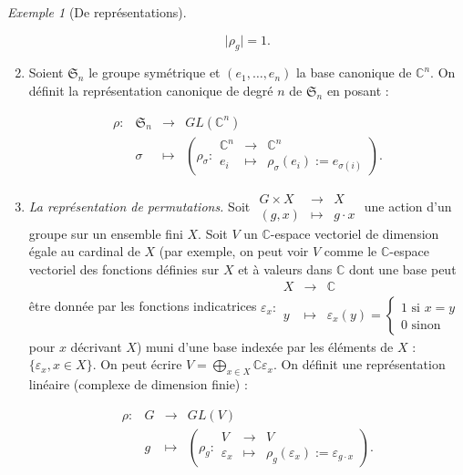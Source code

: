 \documentclass[french]{book}
\theoremstyle{definition}
\theoremstyle{remark}
\newtheorem*{protoexemple}{Exemple}
\newenvironment{exemple}
    {\colorlet{shadecolor}{gray!10}\begin{shaded}\begin{protoexemple}}
    {\end{protoexemple}\end{shaded}}
\begin{document}
\begin{exemple}[De représentations]
\begin{enumerate}
      \[
      \lvert \rho_g \rvert = 1.
      \]

      \item Soient $\mathfrak{S}_n$ le groupe symétrique et $(e_1, \dots, e_n)$ la base canonique de $\mathbb{C} ^{n}$. On définit la représentation canonique de degré $n$ de $\mathfrak{S}_n$ en posant :

      \[\begin{matrix}
      \rho : & \mathfrak{S}_n & \longrightarrow & GL(\mathbb{C} ^{n}) \\
      \ & \sigma & \longmapsto & \left( \rho _{\sigma} : \begin{matrix}
      \mathbb{C} ^{n} & \longrightarrow & \mathbb{C}^{n} \\
      e_i & \longmapsto & \rho _{\sigma}(e_i) := e _{\sigma(i)}
      \end{matrix}\right).
      \end{matrix}\]





      \item \emph{La représentation de permutations.} Soit \(\begin{matrix}
       G \times X & \longrightarrow & X \\
       (g,x) & \longmapsto & g \cdot x
     \end{matrix}\) une action d'un groupe sur un ensemble fini \(X\). Soit \(V\) un \(\mathbb{C}\)-espace vectoriel de dimension égale au cardinal de \(X\) (par exemple, on peut voir \(V\) comme le \(\mathbb{C}\)-espace vectoriel des fonctions définies sur \(X\) et à valeurs dans \(\mathbb{C}\) dont une base peut être donnée par les fonctions indicatrices \( \varepsilon_x : \begin{matrix}
       X & \longrightarrow & \mathbb{C} \\
       y & \longmapsto & \varepsilon_x(y) = \begin{cases}
        1 \text{ si } x=y \\
        0 \text{ sinon }
      \end{cases}
      \end{matrix}\) pour \(x\) décrivant \(X\)) muni d'une base indexée par les éléments de \(X\) : \(\{ \varepsilon_x, x \in X \} \). On peut écrire \(V = \bigoplus _{x \in X} \mathbb{C} \varepsilon_x\). On définit une représentation linéaire (complexe de dimension finie) :

      \[\begin{matrix}
      \rho : & G & \longrightarrow & GL(V) \\
      \ & g & \longmapsto &\left( \rho_g : \begin{matrix}
      V & \longrightarrow & V \\
      \varepsilon_x & \longmapsto & \rho_g(\varepsilon_x) := \varepsilon _{g \cdot x}
      \end{matrix} \right).
      \end{matrix}\]


\end{enumerate}
\end{exemple}
\end{document}
